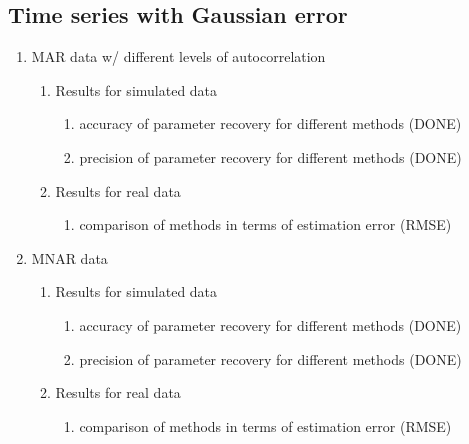 \subsection*{Time series with Gaussian error}
\begin{enumerate}
    \item MAR data w/ different levels of autocorrelation
        \begin{enumerate}
            \item Results for simulated data
            \begin{enumerate}
                \item accuracy of parameter recovery for different methods (DONE) 
                \item precision of parameter recovery for different methods (DONE)
            \end{enumerate}
            \item Results for real data 
            \begin{enumerate}
                 \item comparison of methods in terms of estimation error (RMSE)
            \end{enumerate}
        \end{enumerate}
    \item MNAR data
    \begin{enumerate}
            \item Results for simulated data
            \begin{enumerate}
               \item accuracy of parameter recovery for different methods (DONE)
                \item precision of parameter recovery for different methods (DONE)
            \end{enumerate}
            \item Results for real data 
                 \begin{enumerate}
                 \item comparison of methods in terms of estimation error (RMSE)
            \end{enumerate}
        \end{enumerate}
\end{enumerate}
